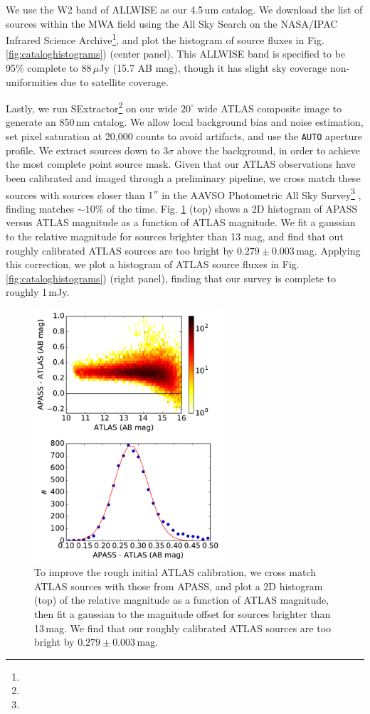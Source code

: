 \documentclass{emulateapj}
\begin{document}
We use the W2 band of ALLWISE \citep{Wright2010,allwise} as our 4.5\,um catalog. We download the list of sources within the MWA field using the All Sky Search on the NASA/IPAC Infrared Science Archive\footnote{}, and plot the histogram of source fluxes in Fig. \ref{fig:cataloghistograms}) (center panel). This ALLWISE band is specified to be 95\% complete to 88\,$\mu$Jy (15.7 AB mag), though it has slight sky coverage non-uniformities due to satellite coverage.

Lastly, we run SExtractor\footnote{} \citep{sextractor} on our wide $20^\circ$ wide ATLAS composite image to generate an 850\,nm catalog. We allow local background bias and noise estimation, set pixel saturation at 20,000 counts to avoid artifacts, and use the {\tt AUTO} aperture profile. We extract sources down to $3\sigma$ above the background, in order to achieve the most complete point source mask. Given that our ATLAS observations have been calibrated and imaged through a preliminary pipeline, we cross match these sources with sources closer than $1''$ in the AAVSO Photometric All Sky Survey\footnote{} \citep{apass}, finding matches $\sim10\%$ of the time. Fig. \ref{fig:ATLASvsAPASS} (top) shows a 2D histogram of APASS versus ATLAS magnitude as a function of ATLAS magnitude. We fit a gaussian to the relative magnitude for sources brighter than 13 mag, and find that out roughly calibrated ATLAS sources are too bright by $0.279\pm0.003$\,mag. Applying this correction, we plot a histogram of ATLAS source fluxes in Fig. \ref{fig:cataloghistograms}) (right panel), finding that our survey is complete to roughly 1\,mJy.

\begin{figure}[t]
\centering
\includegraphics[width=2.75in]{images/ATLAS_vs_APASS_cal.pdf}
\caption{To improve the rough initial ATLAS calibration, we cross match ATLAS sources with those from APASS, and plot a 2D histogram (top) of the relative magnitude as a function of ATLAS magnitude, then fit a gaussian to the magnitude offset for sources brighter than 13\,mag. We find that our roughly calibrated ATLAS sources are too bright by $0.279\pm0.003$\,mag.}
\label{fig:ATLASvsAPASS}
\end{figure}
\end{document}
